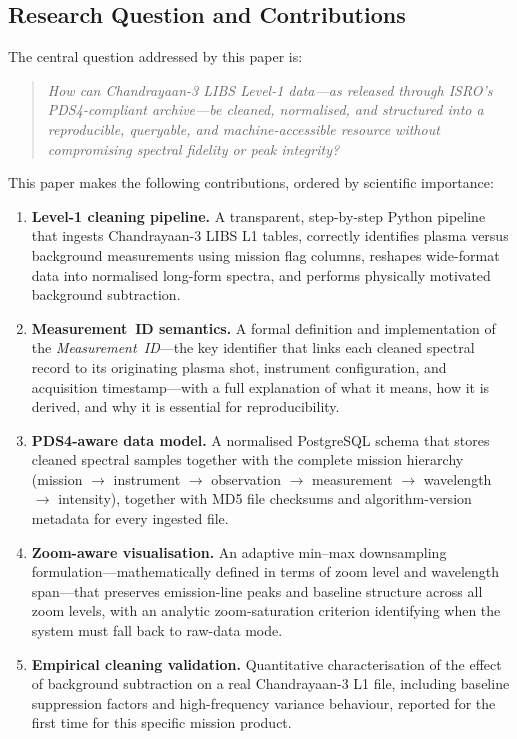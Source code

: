 \documentclass[a4paper,twocolumn,10pt]{article}
\begin{document}
\subsection{Research Question and Contributions}

The central question addressed by this paper is:

\begin{quote}
\emph{How can Chandrayaan-3 LIBS Level-1 data---as released through
ISRO's PDS4-compliant archive---be cleaned, normalised, and structured
into a reproducible, queryable, and machine-accessible resource
without compromising spectral fidelity or peak integrity?}
\end{quote}

This paper makes the following contributions, ordered by scientific
importance:

\begin{enumerate}[label=\textbf{(C\arabic*)},leftmargin=*,itemsep=3pt]
  \item \textbf{Level-1 cleaning pipeline.}  A transparent,
    step-by-step Python pipeline that ingests Chandrayaan-3 LIBS L1
    tables, correctly identifies plasma versus background measurements
    using mission flag columns, reshapes wide-format data into
    normalised long-form spectra, and performs physically motivated
    background subtraction.

  \item \textbf{Measurement~ID semantics.}  A formal definition and
    implementation of the \emph{Measurement~ID}---the key identifier
    that links each cleaned spectral record to its originating plasma
    shot, instrument configuration, and acquisition timestamp---with a
    full explanation of what it means, how it is derived, and why it
    is essential for reproducibility.

  \item \textbf{PDS4-aware data model.}  A normalised PostgreSQL
    schema that stores cleaned spectral samples together with the
    complete mission hierarchy (mission $\rightarrow$ instrument
    $\rightarrow$ observation $\rightarrow$ measurement $\rightarrow$
    wavelength $\rightarrow$ intensity), together with MD5 file
    checksums and algorithm-version metadata for every ingested file.

  \item \textbf{Zoom-aware visualisation.}  An adaptive min--max
    downsampling formulation---mathematically defined in terms of
    zoom level and wavelength span---that preserves emission-line peaks
    and baseline structure across all zoom levels, with an analytic
    zoom-saturation criterion identifying when the system must fall
    back to raw-data mode.

  \item \textbf{Empirical cleaning validation.}  Quantitative
    characterisation of the effect of background subtraction on a real
    Chandrayaan-3 L1 file, including baseline suppression factors and
    high-frequency variance behaviour, reported for the first time for
    this specific mission product.
\end{enumerate}
\end{document}
